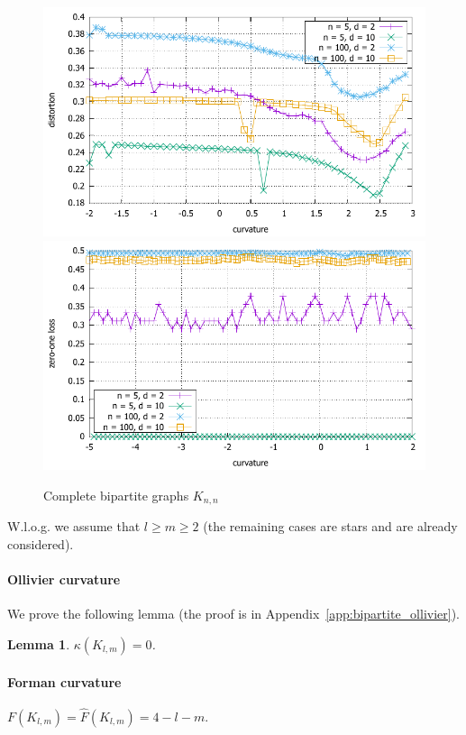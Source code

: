 \documentclass{article} %
\newtheorem{lemma}[theorem]{Lemma}
\begin{document}
\begin{figure}
    \centering
    \includegraphics[width = 0.49 \textwidth]{bipartite_distortion.pdf}
    \includegraphics[width = 0.49 \textwidth]{bipartite_zero_one.pdf}
    \caption{Complete bipartite graphs $K_{n,n}$}
    \label{fig:bipartite}
\end{figure}


W.l.o.g. we assume that $l \ge m \ge 2$ (the remaining cases are stars and are already considered). 

\paragraph{Ollivier curvature}  
We prove the following lemma (the proof is in Appendix~\ref{app:bipartite_ollivier}).

\begin{lemma}\label{lem:bipartite_ollivier}
$\kappa(K_{l,m}) = 0$.
\end{lemma}

\paragraph{Forman curvature} 

$F(K_{l,m}) = \hat F(K_{l,m}) = 4 - l - m$. 

\end{document}
